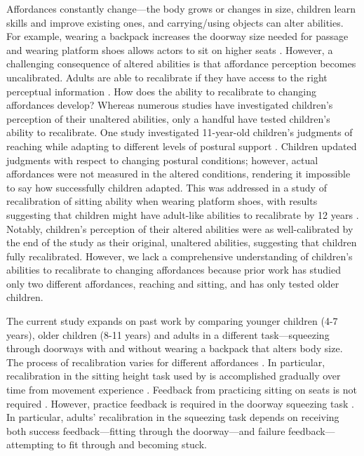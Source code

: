 \documentclass[a4paper,man,natbib,floatsintext,noextraspace]{apa6}
\begin{document}
Affordances constantly change---the body grows or changes in size, children learn skills and improve existing ones, and carrying/using objects can alter abilities. For example, wearing a backpack increases the doorway size needed for passage  and wearing platform shoes allows actors to sit on higher seats \citep{Mark87}. However, a challenging consequence of altered abilities is that affordance perception becomes uncalibrated. Adults are able to recalibrate if they have access to the right perceptual information \citep{Recal,DoorwayLearning,Mark87,MarkSitting90}. How does the ability to recalibrate to changing affordances develop? Whereas numerous studies have investigated children's perception of their unaltered abilities, only a handful have tested children's ability to recalibrate. One study investigated 11-year-old children’s judgments of reaching while adapting to different levels of postural support \citep{JohnsonWade2009}. Children updated judgments with respect to changing postural conditions; however, actual affordances were not measured in the altered conditions, rendering it impossible to say how successfully children adapted. This was addressed in a study of recalibration of sitting ability when wearing platform shoes, with results suggesting that children might have adult-like abilities to recalibrate by 12 years \citep{ChenRecal}. Notably, children's perception of their altered abilities were as well-calibrated by the end of the study as their original, unaltered abilities, suggesting that children fully recalibrated. However, we lack a comprehensive understanding of children's abilities to recalibrate to changing affordances because prior work has studied only two different affordances, reaching and sitting, and has only tested older children. 

The current study expands on past work by comparing younger children (4-7 years), older children (8-11 years) and adults in a different task---squeezing through doorways with and without wearing a backpack that alters body size. The process of recalibration varies for different affordances \citep{Recal}. In particular, recalibration in the sitting height task used by \cite{ChenRecal} is accomplished gradually over time from movement experience \cite{Mark87}. Feedback from practicing sitting on seats is not required \citep{MarkSitting90}. However, practice feedback is required in the doorway squeezing task \citep{Recal,DoorwayLearning}. In particular, adults' recalibration in the squeezing task depends on receiving both success feedback---fitting through the doorway---and failure feedback---attempting to fit through and becoming stuck. 
\end{document}
